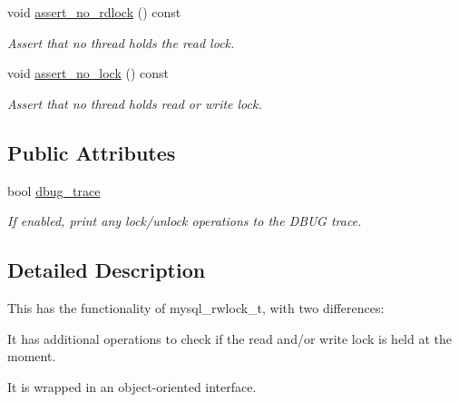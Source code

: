 \begin{DoxyCompactItemize}
\mbox{\label{classCheckable__rwlock_a1f85df65b8c2f47d9698b562d7ce19c9}} 
void \mbox{\hyperlink{classCheckable__rwlock_a1f85df65b8c2f47d9698b562d7ce19c9}{assert\+\_\+no\+\_\+rdlock}} () const
\begin{DoxyCompactList}\small\item\em Assert that no thread holds the read lock. \end{DoxyCompactList}\item 
\mbox{\label{classCheckable__rwlock_a69b6341d9d2a8f6c60e453db494a7cc2}} 
void \mbox{\hyperlink{classCheckable__rwlock_a69b6341d9d2a8f6c60e453db494a7cc2}{assert\+\_\+no\+\_\+lock}} () const
\begin{DoxyCompactList}\small\item\em Assert that no thread holds read or write lock. \end{DoxyCompactList}\end{DoxyCompactItemize}
\subsection*{Public Attributes}
\begin{DoxyCompactItemize}
\item 
\mbox{\label{classCheckable__rwlock_a733b3b873c878b8f52c94b9303218acb}} 
bool \mbox{\hyperlink{classCheckable__rwlock_a733b3b873c878b8f52c94b9303218acb}{dbug\+\_\+trace}}
\begin{DoxyCompactList}\small\item\em If enabled, print any lock/unlock operations to the D\+B\+UG trace. \end{DoxyCompactList}\end{DoxyCompactItemize}


\subsection{Detailed Description}
This has the functionality of mysql\+\_\+rwlock\+\_\+t, with two differences\+:
\begin{DoxyEnumerate}
\item It has additional operations to check if the read and/or write lock is held at the moment.
\item It is wrapped in an object-\/oriented interface.
\end{DoxyEnumerate}

